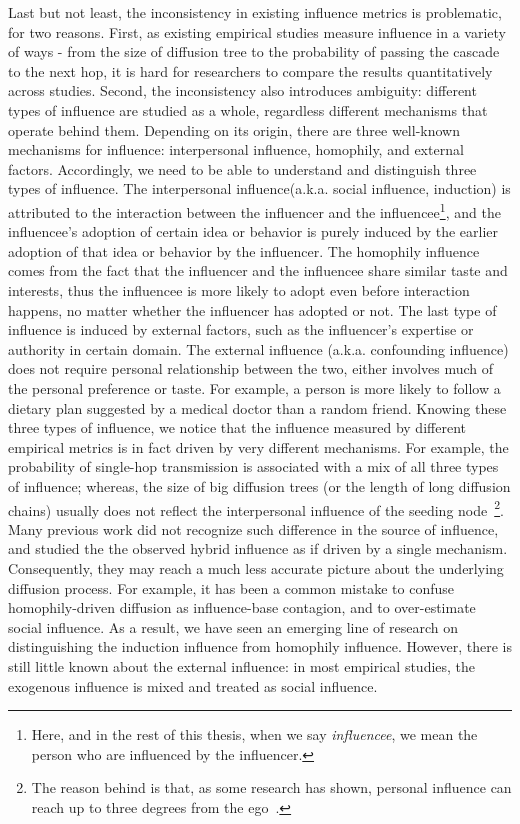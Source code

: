 \documentclass[phd,tocprelim]{cornell}
\begin{document}
Last but not least, the inconsistency in existing influence metrics is problematic, for two reasons. First, as existing empirical studies measure influence in a variety of ways - from the size of diffusion tree to the probability of passing the cascade to the next hop, it is hard for researchers to compare the results quantitatively across studies. Second, the inconsistency also introduces ambiguity: different types of influence are studied as a whole, regardless different mechanisms that operate behind them. Depending on its origin, there are three well-known mechanisms for influence: interpersonal influence, homophily, and external factors. Accordingly, we need to be able to understand and distinguish three types of influence. The interpersonal  influence(a.k.a. social influence, induction) is attributed to the interaction between the influencer and the influencee\footnote{Here, and in the rest of this thesis, when we say \emph{influencee}, we mean the person who are influenced by the influencer.}, and the influencee's adoption of certain idea or behavior is purely induced by the earlier adoption of that idea or behavior by the influencer. The homophily influence comes from the fact that the influencer and the influencee share similar taste and interests, thus the influencee is more likely to adopt even before interaction happens, no matter whether the influencer has adopted or not. The last type of influence is induced by external factors, such as the influencer's expertise or authority in certain domain. The external influence (a.k.a. confounding influence) does not require personal relationship between the two, either involves much of the personal preference or taste. For example, a person is more likely to follow a dietary plan suggested by a medical doctor than a random friend.
Knowing these three types of influence, we notice that the influence measured by different empirical metrics is in fact driven by very different mechanisms. For example, the probability of single-hop transmission is associated with a mix of all three types of influence; whereas, the size of big diffusion trees (or the length of long diffusion chains) usually does not reflect the interpersonal influence of the seeding node~\cite{Sun-2009}\footnote{The reason behind is that, as some research has shown, personal influence can reach up to three degrees from the ego~\cite{christakis-2011}.}. Many previous work did not recognize such difference in the source of influence, and studied the the observed hybrid influence as if driven by a single mechanism. Consequently, they may reach a much less accurate picture about the underlying diffusion process. For example, it has been a common mistake to confuse homophily-driven diffusion as influence-base contagion, and to over-estimate social influence. As a result, we have seen an emerging line of research on distinguishing the induction influence from homophily influence. However, there is still little known about the external influence: in most empirical studies, the exogenous influence is mixed and treated as social influence.
\end{document}
